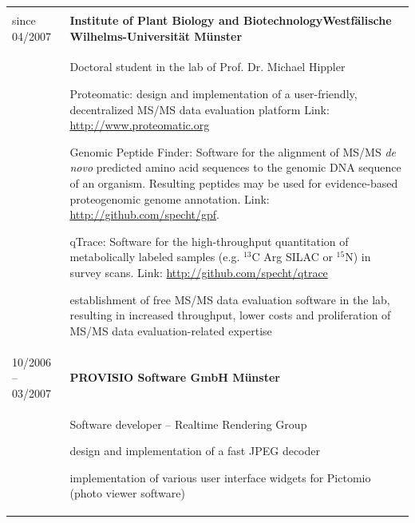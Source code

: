 \documentclass[11pt,a4paper,twoside]{report}
\makeatletter
\newcommand{\second}[1]{{\vspace{1ex}}{\large \textbf{#1}}}
\newcommand{\tabspace}[0]{\vspace{2mm}}
\newcommand{\cvsubheader}[1]{\multicolumn{2}{@{}l}{\second{#1}} \\ \nopagebreak[4]}
\newcommand{\cvtitle}[2]{#1 & \textbf{#2} \\ \nopagebreak}
\makeatother
\begin{document}
\begin{longtable}{@{}lp{12.5cm}}
\newpage 

\cvsubheader{Professional experience}

\cvtitle{since 04/2007}{Institute of Plant Biology and Biotechnology\newline Westfälische Wilhelms-Universität Münster}
& Doctoral student in the lab of Prof. Dr. Michael Hippler \newline
\vspace{-9pt}
\begin{compactitem}
\item Proteomatic: design and implementation of a user-friendly, decentralized MS/MS data 
evaluation platform \vspace{4pt}\newline
Link: \href{http://www.proteomatic.org}{http://www.proteomatic.org}
\item Genomic Peptide Finder: Software for the alignment of MS/MS {\em de novo}
predicted amino acid sequences to the genomic DNA sequence of an organism.
Resulting peptides may be used for evidence-based proteogenomic genome annotation. \vspace{4pt}\newline
Link: \href{http://github.com/specht/gpf}{http://github.com/specht/gpf}.
\item qTrace: Software for the high-throughput quantitation of metabolically
labeled samples (e.g. $^{\textrm{13}}$C Arg SILAC or $^{\textrm{15}}$N) in survey scans.\vspace{4pt}\newline
Link: \href{http://github.com/specht/qtrace}{http://github.com/specht/qtrace}
\item establishment of free MS/MS data evaluation software in the lab, resulting 
in increased throughput, lower costs and proliferation of MS/MS data 
evaluation-related expertise
\end{compactitem}
\tabspace\\

\cvtitle{10/2006 -- 03/2007}{PROVISIO Software GmbH Münster}
& Software developer -- Realtime Rendering Group \newline
\vspace{-9pt}
\begin{compactitem}
\item design and implementation of a fast JPEG decoder
\item implementation of various user interface widgets for Pictomio
(photo viewer software)
\end{compactitem}
\vspace{-6pt}
\tabspace\\


\end{longtable}
\end{document}
